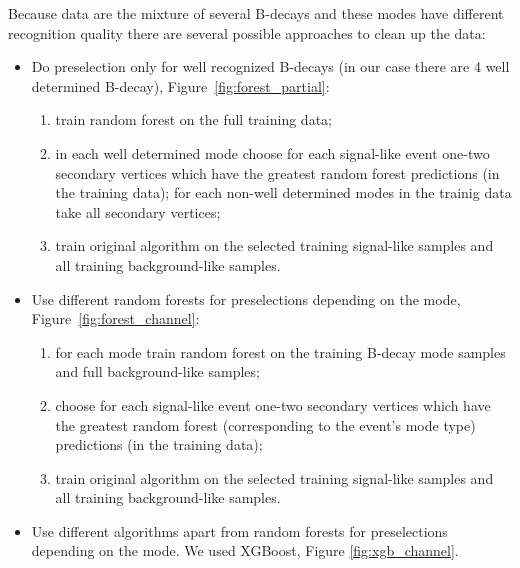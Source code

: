 \documentclass{llncs}
\begin{document}
Because data are the mixture of several B-decays and these modes have different recognition quality there are several possible approaches to clean up the data:
\begin{itemize}
	\item Do preselection only for well recognized B-decays (in our case there are 4 well determined B-decay), Figure~\ref{fig:forest_partial}:
		\begin{enumerate}
			\item train random forest on the full training data;
			\item in each well determined mode choose for each signal-like event one-two secondary vertices which have the greatest random forest predictions (in the training data); for each non-well determined modes in the trainig data take all secondary vertices;
			\item train original algorithm on the selected training signal-like samples and all training background-like samples.
		\end{enumerate}

	\item Use different random forests for preselections depending on the mode, Figure~\ref{fig:forest_channel}:
	\begin{enumerate}
			\item for each mode train random forest on the training B-decay mode samples and full background-like samples;
			\item choose for each signal-like event one-two secondary vertices which have the greatest random forest (corresponding to the event's mode type) predictions (in the training data);
			\item train original algorithm on the selected training signal-like samples and all training background-like samples.
		\end{enumerate}
	\item Use different algorithms apart from random forests for preselections depending on the mode. We used XGBoost, Figure \ref{fig:xgb_channel}.
\end{itemize}
\end{document}
